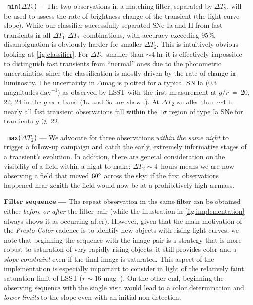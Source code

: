 \documentclass[letterpaper,longauthor,trackchanges,twocolumn,onecolappendix,sort&compress]{aastex62}
\newcommand{\red}[1]{\textcolor{red}{#1}}
\newcommand{\dtone}{\ensuremath{\Delta T_1}}
\newcommand{\dttwo}{\ensuremath{\Delta T_2}}
\begin{document}
\vspace{1.5mm}
{\tt { min(\dttwo) ---}} The two observations in a matching filter, separated by \dttwo, will be used to assess the rate of brightness change of the transient (the light curve slope). While our classifier successfully separated SNe Ia and II from fast transients in all \dtone-\dttwo\ combinations, with accuracy exceeding 95\%, disambiguation is obviously harder for smaller \dttwo. This is intuitively obvious looking at \autoref{fig:classifier}. %
For \dttwo\ smaller than $\sim4$ hr it is effectively impossible to distinguish fast transients from ``normal'' ones due to the photometric uncertainties, since the classification is mostly driven by the rate of change in luminosity. The uncertainty in $\Delta$mag is plotted for a typical SN Ia (0.3 magnitudes $\mathrm{day}^{-1}$) as observed by LSST with the first measurement at $g/r~=~$20, 22, 24 in the $g$ or $r$ band ($1\sigma$ and $3\sigma$ are shown). At \dttwo\ smaller than $\sim4$ hr nearly all fast transient observations fall within the $1\sigma$ region of type Ia SNe for transients $g~\gtrsim~22$.

\vspace{1.5mm}
{\tt { max(\dttwo)}} --- We advocate for three observations \emph{within the same night} to trigger a follow-up campaign and catch the early, extremely informative stages of a transient’s evolution. In addition, there are general consideration on the visibility of a field within a night to make: $\dttwo\sim4$~hours means we are now observing a field that moved $60\mbox{$^\circ$}$ across the sky: if the first observations happened near zenith the field would now be at a prohibitively high airmass. 

\vspace{1.5mm}
{\bf Filter sequence ---} The repeat observation in the same filter can be obtained either \emph{before or after} the filter pair (while the illustration in \autoref{fig:implementation} always shows it as occurring after). However, given that the main motivation of the {\em Presto-Color} cadence is to identify new objects with rising light curves, we note that beginning the sequence with the image pair is a strategy that is more robust to saturation of very rapidly rising objects: it still provides color and a \emph{slope constraint} even if the final image is saturated. This aspect of the implementation is especially important to consider in light of the relatively faint saturation limit of LSST ($r\sim16$ mag; \citealt{lsst}).
On the other end, beginning the observing sequence with the single visit would lead to a color determination and \emph{lower limits}  to the slope even with an initial non-detection.
\end{document}
